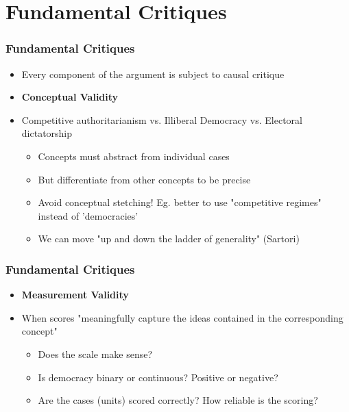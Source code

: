 \documentclass[xcolor=x11names,compress]{beamer}\usepackage[]{graphicx}\usepackage[]{color}
\renewcommand{\(}{\begin{columns}}
\renewcommand{\)}{\end{columns}}
\newcommand{\<}[1]{\begin{column}{#1}}
\renewcommand{\>}{\end{column}}
\begin{document}




\section{Fundamental Critiques}

\begin{frame}
\frametitle{Fundamental Critiques}
\begin{itemize}
\item Every component of the argument is subject to causal critique
\pause
\item \textbf{Conceptual Validity}
\pause
\item Competitive authoritarianism vs. Illiberal Democracy vs. Electoral dictatorship
\pause
\begin{itemize}
\item Concepts must abstract from individual cases
\pause
\item But differentiate from other concepts to be precise
\pause
\item Avoid conceptual stetching! Eg. better to use "competitive regimes" instead of 'democracies'
\pause
\item We can move "up and down the ladder of generality" (Sartori)
\pause
\end{itemize}
\end{itemize}
\end{frame}

\begin{frame}
\frametitle{Fundamental Critiques}
\begin{itemize}
\item \textbf{Measurement Validity}
\pause
\item When scores "meaningfully capture the ideas contained in the corresponding concept"
\pause
\begin{itemize}
\item Does the scale make sense? 
\pause
\item Is democracy binary or continuous? Positive or negative?
\pause
\item Are the cases (units) scored correctly? How reliable is the scoring?
\end{itemize}
\end{itemize}
\end{frame}
\end{document}
